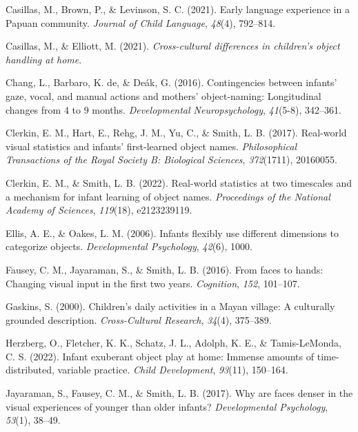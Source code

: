 \documentclass[10pt, letterpaper]{article}
\newenvironment{CSLReferences}%
  {}%
  {\par}
\begin{document}
\begin{CSLReferences}{1}{0}
\leavevmode\hypertarget{ref-casillas2021early}{}%
Casillas, M., Brown, P., \& Levinson, S. C. (2021). Early language
experience in a {Papuan} community. \emph{Journal of Child Language},
\emph{48}(4), 792--814.

\leavevmode\hypertarget{ref-casillasURdaylong}{}%
Casillas, M., \& Elliott, M. (2021). \emph{Cross-cultural differences in
children's object handling at home}.

\leavevmode\hypertarget{ref-chang2016contingencies}{}%
Chang, L., Barbaro, K. de, \& Deák, G. (2016). Contingencies between
infants' gaze, vocal, and manual actions and mothers' object-naming:
Longitudinal changes from 4 to 9 months. \emph{Developmental
Neuropsychology}, \emph{41}(5-8), 342--361.

\leavevmode\hypertarget{ref-clerkin2017real}{}%
Clerkin, E. M., Hart, E., Rehg, J. M., Yu, C., \& Smith, L. B. (2017).
Real-world visual statistics and infants' first-learned object names.
\emph{Philosophical Transactions of the Royal Society B: Biological
Sciences}, \emph{372}(1711), 20160055.

\leavevmode\hypertarget{ref-clerkin2022real}{}%
Clerkin, E. M., \& Smith, L. B. (2022). Real-world statistics at two
timescales and a mechanism for infant learning of object names.
\emph{Proceedings of the National Academy of Sciences}, \emph{119}(18),
e2123239119.

\leavevmode\hypertarget{ref-ellis2006infants}{}%
Ellis, A. E., \& Oakes, L. M. (2006). Infants flexibly use different
dimensions to categorize objects. \emph{Developmental Psychology},
\emph{42}(6), 1000.

\leavevmode\hypertarget{ref-fausey2016faces}{}%
Fausey, C. M., Jayaraman, S., \& Smith, L. B. (2016). From faces to
hands: Changing visual input in the first two years. \emph{Cognition},
\emph{152}, 101--107.

\leavevmode\hypertarget{ref-gaskins2000childrens}{}%
Gaskins, S. (2000). Children's daily activities in a {M}ayan village: A
culturally grounded description. \emph{Cross-Cultural Research},
\emph{34}(4), 375--389.

\leavevmode\hypertarget{ref-herzberg2022infant}{}%
Herzberg, O., Fletcher, K. K., Schatz, J. L., Adolph, K. E., \&
Tamis-LeMonda, C. S. (2022). Infant exuberant object play at home:
Immense amounts of time-distributed, variable practice. \emph{Child
Development}, \emph{93}(11), 150--164.

\leavevmode\hypertarget{ref-jayaraman2017faces}{}%
Jayaraman, S., Fausey, C. M., \& Smith, L. B. (2017). Why are faces
denser in the visual experiences of younger than older infants?
\emph{Developmental Psychology}, \emph{53}(1), 38--49.


\end{CSLReferences}
\end{document}
